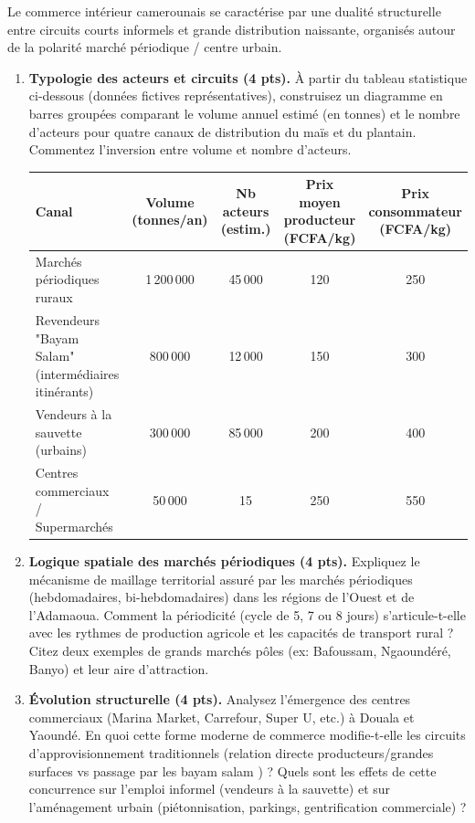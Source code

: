 \documentclass[11pt]{article}
\begin{document}
\begin{exercice}
Le commerce intérieur camerounais se caractérise par une dualité structurelle entre circuits courts informels et grande distribution naissante, organisés autour de la polarité marché périodique / centre urbain.

\begin{enumerate}
    \item \textbf{Typologie des acteurs et circuits (4 pts).} À partir du tableau statistique ci-dessous (données fictives représentatives), construisez un diagramme en barres groupées comparant le volume annuel estimé (en tonnes) et le nombre d'acteurs pour quatre canaux de distribution du maïs et du plantain. Commentez l'inversion entre volume et nombre d'acteurs.

    \begin{center}
    \begin{tabular}{|l|c|c|c|c|}
    \hline
    \textbf{Canal} & \textbf{Volume (tonnes/an)} & \textbf{Nb acteurs (estim.)} & \textbf{Prix moyen producteur (FCFA/kg)} & \textbf{Prix consommateur (FCFA/kg)} \\
    \hline
    Marchés périodiques ruraux & 1\,200\,000 & 45\,000 & 120 & 250 \\
    \hline
    Revendeurs "Bayam Salam" (intermédiaires itinérants) & 800\,000 & 12\,000 & 150 & 300 \\
    \hline
    Vendeurs à la sauvette (urbains) & 300\,000 & 85\,000 & 200 & 400 \\
    \hline
    Centres commerciaux / Supermarchés & 50\,000 & 15 & 250 & 550 \\
    \hline
    \end{tabular}
    \end{center}

    \item \textbf{Logique spatiale des marchés périodiques (4 pts).} Expliquez le mécanisme de \og maillage territorial \fg assuré par les marchés périodiques (hebdomadaires, bi-hebdomadaires) dans les régions de l'Ouest et de l'Adamaoua. Comment la périodicité (cycle de 5, 7 ou 8 jours) s'articule-t-elle avec les rythmes de production agricole et les capacités de transport rural ? Citez deux exemples de grands marchés pôles (ex: Bafoussam, Ngaoundéré, Banyo) et leur aire d'attraction.
    \item \textbf{Évolution structurelle (4 pts).} Analysez l'émergence des centres commerciaux (Marina Market, Carrefour, Super U, etc.) à Douala et Yaoundé. En quoi cette forme moderne de commerce modifie-t-elle les circuits d'approvisionnement traditionnels (relation directe producteurs/grandes surfaces vs passage par les \og bayam salam \fg) ? Quels sont les effets de cette concurrence sur l'emploi informel (vendeurs à la sauvette) et sur l'aménagement urbain (piétonnisation, parkings, gentrification commerciale) ?
\end{enumerate}
\end{exercice}
\end{document}
